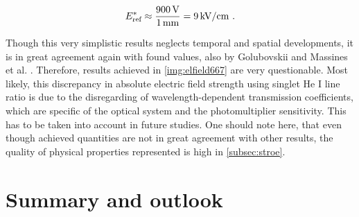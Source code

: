 \documentclass[a4paper,10pt,twoside]{article}
\newcommand{\ix}[1]{_\text{#1}}
\begin{document}
			\begin{align}
				E^*\ix{ref}\approx\frac{\unit[900]{V}}{\unit[1]{mm}}=\unit[9]{kV/cm}\,\,. \nonumber
			\end{align}
		
		Though this very simplistic results neglects temporal and spatial developments, it is in great agreement again with found values, also by Golubovskii and Massines et al. \cite{Massines} \cite{0022-3727-36-1-306}. Therefore, results achieved in \autoref{img:elfield667} are very questionable. Most likely, this discrepancy in absolute electric field strength using singlet He I line ratio is due to the disregarding of wavelength-dependent transmission coefficients, which are specific of the optical system and the photomultiplier sensitivity. This has to be taken into account in future studies. One should note here, that even though achieved quantities are not in great agreement with other results, the quality of physical properties represented is high in \autoref{subsec:stroe}.
		
	\section{Summary and outlook}
	
\end{document}
